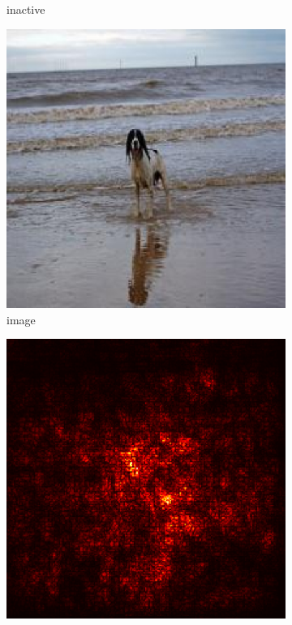 \documentclass[preprint,12pt]{elsarticle}
\begin{document}
\begin{figure}
\begin{subfigure}{0.14\textwidth}
        \caption{inactive}
    \end{subfigure}
    \hfill
    \begin{subfigure}{0.14\linewidth}
        \centering
        \includegraphics[width=\linewidth]{../visualizations/examples/imagenette/resnet18/images/3.png}
        \caption{image}
    \end{subfigure}
    \hfill
    \begin{subfigure}{0.14\linewidth}
        \centering
        \includegraphics[width=\linewidth]{../visualizations/examples/imagenette/resnet18/saliency_map/3.png}

\end{subfigure}
\end{figure}
\end{document}
